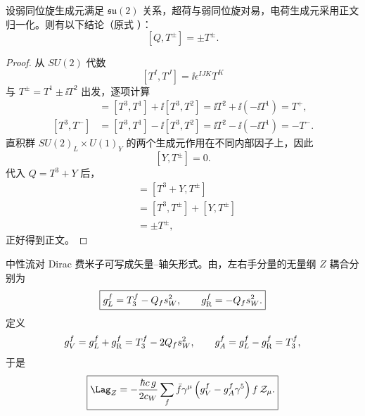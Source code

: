 \begin{proposition}[升降生成元的电荷对易关系]
设弱同位旋生成元满足 $\mathfrak{su}(2)$ 关系，超荷与弱同位旋对易，电荷生成元采用正文归一化。则有以下结论（原式 ）：
\begin{equation*}
\boxed{[Q,T^\pm]=\pm T^\pm.}
\end{equation*}
\end{proposition}
\begin{proof}
从 $SU(2)$ 代数
\[
[T^I,T^J]=\ii\epsilon^{IJK}T^K
\]
与 $T^\pm=T^1\pm\ii T^2$ 出发，逐项计算
\begin{align*}
[T^3,T^+]
&=[T^3,T^1]+\ii[T^3,T^2]
=\ii T^2+\ii(-\ii T^1)
=T^+,\\
[T^3,T^-]
&=[T^3,T^1]-\ii[T^3,T^2]
=\ii T^2-\ii(-\ii T^1)
=-T^-.
\end{align*}
直积群 $SU(2)_L\times U(1)_Y$ 的两个生成元作用在不同内部因子上，因此
\[
[Y,T^\pm]=0.
\]
代入 $Q=T^3+Y$ 后，
\begin{align*}
[Q,T^\pm]
&=[T^3+Y,T^\pm]\\
&=[T^3,T^\pm]+[Y,T^\pm]\\
&=\pm T^\pm,
\end{align*}
正好得到正文。
\end{proof}


\begin{definition}[$Z$ 流的手征与矢量轴矢耦合]
中性流对 Dirac 费米子可写成矢量--轴矢形式。由，左右手分量的无量纲 $Z$ 耦合分别为
\begin{equation}
\boxed{
 g_L^f=T_3^f-Q_fs_W^2,
 \qquad
 g_{\rm R}^f=-Q_fs_W^2.}
\label{eq:sm-z-chiral-couplings-dp68}
\end{equation}
定义
\begin{equation*}
 g_V^f=g_L^f+g_{\rm R}^f=T_3^f-2Q_fs_W^2,
 \qquad
 g_A^f=g_L^f-g_{\rm R}^f=T_3^f,
\end{equation*}
于是
\begin{equation}
 \boxed{
 \Lag_Z
 =-\frac{\hbar c\,g}{2c_W}
 \sum_f
 \bar f\gamma^\mu\left(g_V^f-g_A^f\gamma^5\right)f\,\mathcal Z_\mu.}
 \label{eq:z-current-lagrangian-dp11}
\end{equation}
\end{definition}

